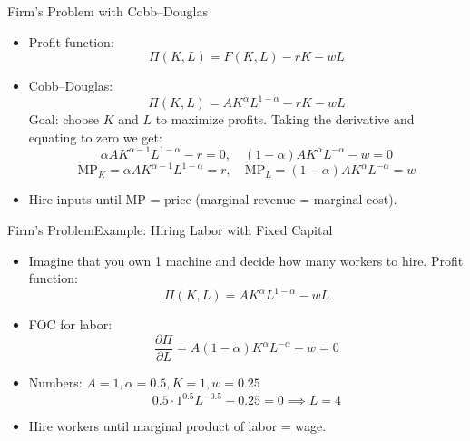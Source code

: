 \documentclass[10pt,aspectratio=169]{beamer}
\begin{document}
\begin{frame}{Firm's Problem with Cobb--Douglas}

\begin{itemize}
    \item Profit function:
    \[
        \Pi(K,L) = F(K,L) - rK - wL
    \]
    \item Cobb--Douglas:
    \[
        \Pi(K,L) = A K^\alpha L^{1-\alpha} - rK - wL
    \]
    \itemvso Goal: choose \(K\) and \(L\) to maximize profits.
    \itemvso Taking the derivative and equating to zero we get:
    \[
        \alpha A K^{\alpha-1} L^{1-\alpha} -r =0 , \quad 
        (1-\alpha) A K^\alpha L^{-\alpha} - w=0 
    \]
    \[
       \text{MP}_K= \alpha A K^{\alpha-1} L^{1-\alpha} =r , \quad 
        \text{MP}_L=(1-\alpha) A K^\alpha L^{-\alpha} = w 
    \]
    \item Hire inputs until MP = price (marginal revenue = marginal cost).
\end{itemize}

\end{frame}

\begin{frame}{Firm's Problem}{Example: Hiring Labor with Fixed Capital}

\begin{itemize}
    \item Imagine that you own 1 machine and decide how many workers to hire.
    \itemvso Profit function:
    \[
        \Pi(K,L) = A K^\alpha L^{1-\alpha} - w L
    \]
    \vspace{-0.3cm}
    \item FOC for labor:
    \[
        \frac{\partial \Pi}{\partial L} = A(1-\alpha) K^\alpha L^{-\alpha} - w = 0
    \]
    \vspace{-0.3cm}
 \item Numbers: \(A=1, \alpha=0.5, K=1, w=0.25\)
    \[
        0.5 \cdot 1^{0.5} L^{-0.5} - 0.25 = 0 \implies L = 4
    \]
    \vspace{-0.3cm}
    \item Hire workers until marginal product of labor = wage.
\end{itemize}

\end{frame}
\end{document}
